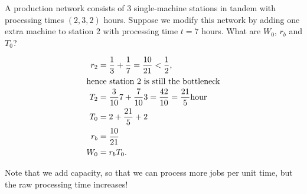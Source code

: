 \begin{exercise}
 A production network consists of 3 single-machine stations in tandem
 with processing times $(2, 3, 2)$ hours. Suppose we modify this
 network by adding one extra machine to station 2 with processing
 time $t=7$ hours. What are $W_0$, $r_b$ and $T_0$?
\begin{solution}
 \begin{align*}
 r_2 &= \frac13 + \frac17 = \frac{10}{21} < \frac12,\\
\intertext{hence station 2 is still the bottleneck}
T_2 &= \frac{3}{10}7 + \frac{7}{10}3 = \frac{42}{10}=\frac{21}{5}\text{hour}\\
T_0&=2+\frac{21}{5} +2\\
r_b &= \frac{10}{21}\\
W_0 &= r_b T_0.
 \end{align*}

 Note that we add capacity, so that we can process more jobs per
 unit time, but the raw processing time increases!
\end{solution}
\end{exercise}


